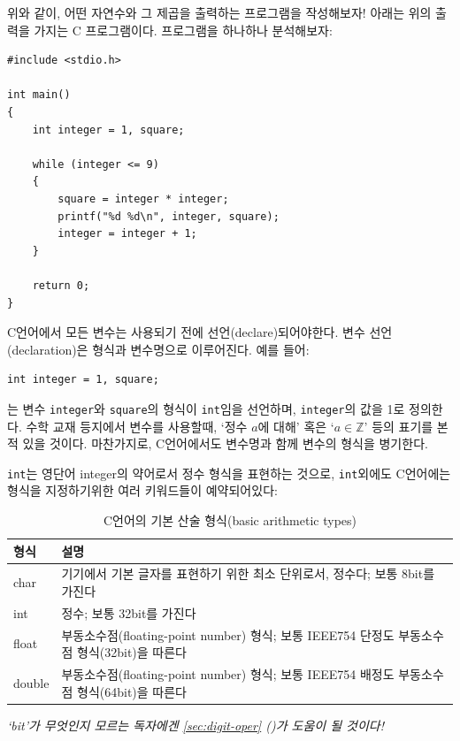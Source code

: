 \documentclass[a4paper,12pt]{book}
\newcommand{\V}[1]{\Verb|#1|}
\newcommand*{\fullref}[1]{\autoref{#1} (\nameref*{#1})}
\begin{document}
위와 같이, 어떤 자연수와 그 제곱을 출력하는 프로그램을 작성해보자!
아래는 위의 출력을 가지는 C 프로그램이다.
프로그램을 하나하나 분석해보자:

\begin{lstlisting}
#include <stdio.h>

int main()
{
    int integer = 1, square;

    while (integer <= 9)
    {
        square = integer * integer;
        printf("%d %d\n", integer, square);
        integer = integer + 1;
    }

    return 0;
}
\end{lstlisting}

C언어에서 모든 변수는 사용되기 전에 선언(declare)되어야한다.
변수 선언(declaration)은 형식과 변수명으로 이루어진다.
예를 들어:

\begin{lstlisting}
int integer = 1, square;
\end{lstlisting}

는 변수 \V{integer}와 \V{square}의 형식이 \V{int}임을 선언하며,
\V{integer}의 값을 1로 정의한다.
수학 교재 등지에서 변수를 사용할때,
`정수 $a$에 대해' 혹은 `$a \in \mathbb{Z}$' 등의 표기를 본 적 있을 것이다.
마찬가지로, C언어에서도 변수명과 함께 변수의 형식을 병기한다.

\V{int}는 영단어 integer의 약어로서 정수 형식을 표현하는 것으로,
\V{int}외에도 C언어에는 형식을 지정하기위한 여러 키워드들이 예약되어있다:

\begin{table}[H]
    \centering

    \caption{C언어의 기본 산술 형식(basic arithmetic types)}
    \label{Tab:basic-arithmetic-types}

    \begin{tabular}{ || m{4em} | m{26em} || }
        \hline
        형식    & 설명 \\
        \hline\hline
        char   & 기기에서 기본 글자를 표현하기 위한 최소 단위로서, 정수다; 보통 8bit를 가진다 \\
        \hline
        int    & 정수; 보통 32bit를 가진다 \\
        \hline
        float  & 부동소수점(floating-point number) 형식; 보통 IEEE754 단정도 부동소수점 형식(32bit)을 따른다 \\
        \hline
        double & 부동소수점(floating-point number) 형식; 보통 IEEE754 배정도 부동소수점 형식(64bit)을 따른다 \\
        \hline
    \end{tabular}
    \newline
    \textit{\color{gray} \small `bit'가 무엇인지 모르는 독자에겐
    \fullref{sec:digit-oper}가 도움이 될 것이다!}
\end{table}
\end{document}
